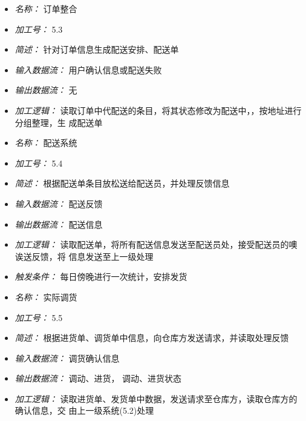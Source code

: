 \begin{itemize}
\item \textit{名称： }订单整合
\item \textit{加工号： } 5.3
\item \textit{简述： } 针对订单信息生成配送安排、配送单
\item \textit{输入数据流： } 用户确认信息或配送失败
\item \textit{输出数据流： } 无
\item \textit{加工逻辑： } 读取订单中代配送的条目，将其状态修改为配送中，，按地址进行分组整理，生 成配送单

\end{itemize}


\vspace{-1mm}


\begin{itemize}
\item \textit{名称： } 配送系统
\item \textit{加工号： }5.4
\item \textit{简述： } 根据配送单条目放松送给配送员，并处理反馈信息
\item \textit{输入数据流： } 配送反馈
\item \textit{输出数据流： } 配送信息
\item \textit{加工逻辑： } 读取配送单，将所有配送信息发送至配送员处，接受配送员的噢诶送反馈，将 信息发送至上一级处理
\item \textit{触发条件： }每日傍晚进行一次统计，安排发货

\end{itemize}


\vspace{-1mm}


\begin{itemize}
\item \textit{名称： } 实际调货
\item \textit{加工号： }5.5
\item \textit{简述： } 根据进货单、调货单中信息，向仓库方发送请求，并读取处理反馈
\item \textit{输入数据流： } 调货确认信息
\item \textit{输出数据流： } 调动、进货， 调动、进货状态
\item \textit{加工逻辑： } 读取进货单、发货单中数据，发送请求至仓库方，读取仓库方的确认信息，交 由上一级系统(5.2)处理

\end{itemize}


\vspace{-1mm}


